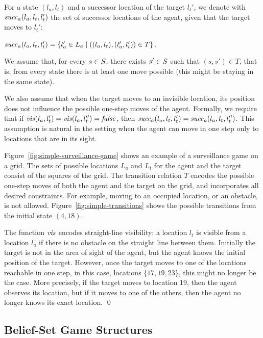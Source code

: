 For a state $(l_a,l_t)$ and a successor location of the target $l_t'$, we denote with $\mathit{succ}_a(l_a,l_t,l_t')$ the set of successor locations of the agent, given that the target moves to $l_t'$: 

$\mathit{succ}_a(l_a,l_t,l_t') = \{l_a' \in L_a \mid  ((l_a,l_t),(l_a',l_t')) \in T\}$.

We assume that, for every $s \in S$, there exists $s' \in S$ such that $(s,s') \in T$, that is, from every state there is at least one move possible (this might be staying in the same state).

We also assume that when the target moves to an invisible location, its position does not influence the possible one-step moves of the agent. Formally, we require that if $\mathit{vis}(l_a,l_t') = \mathit{vis}(l_a,l_t'')=\mathit{false}$, then $\mathit{succ}_a(l_a,l_t,l_t') = \mathit{succ}_a(l_a,l_t,l_t'')$. This assumption is natural in the setting when the agent can move in one step only to locations that are in its sight.

\begin{example}\label{ex:simple-surveillance-game}
Figure~\ref{fig:simple-surveillance-game} shows an example of a surveillance game on a grid.  The sets of possible locations $L_a$ and $L_t$ for the agent and the target consist of the squares of the  grid. The transition relation $T$ encodes the possible one-step moves of both the agent and the target on the grid, and incorporates all desired constraints. For example, moving to an occupied location, or an obstacle, is not allowed. Figure~\ref{fig:simple-transitions} shows the possible transitions from the initial state $(4,18)$.

The function $\mathit{vis}$ encodes straight-line visibility: a location $l_t$ is visible from a location $l_a$ if there is no obstacle on the straight line between them. Initially the target is not in the area of sight of the agent, but the agent knows the initial position of the target. However, once the target moves to one of the locations reachable in one step, in this case, locations $\{17,19,23\}$, this might no longer be the case. More precisely, if the target moves to location $19$, then the agent observes its location, but if it moves to one of the others, then the agent no longer knows its exact location. \qed
\end{example}




\subsection{Belief-Set Game Structures}

